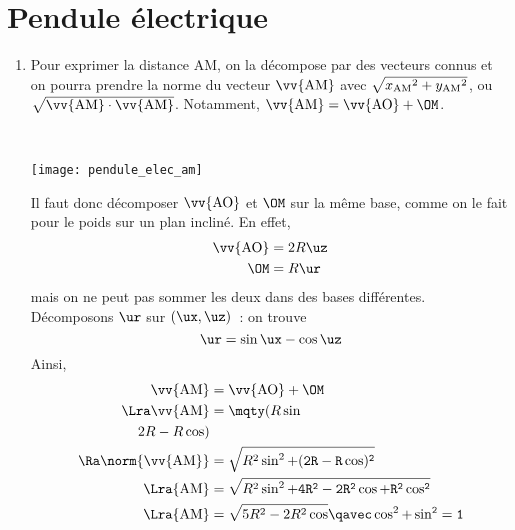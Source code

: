 \documentclass[a4paper, 12pt, final, garamond]{book}
\begin{document}
\section{Pendule électrique}
\begin{enumerate}
    \item Pour exprimer la distance AM, on la décompose par des vecteurs connus
        et on pourra prendre la norme du vecteur $\vv{\rm AM}$ avec
        $\sqrt{x_{\rm AM}{}^2 + y_{\rm AM}{}^2}$, ou $\sqrt{\vv{\rm
        AM}\cdot\vv{\rm AM}}$. Notamment, $\vv{\rm AM} = \vv{\rm AO} + \OM$.
        \begin{minipage}[t]{0.33\linewidth}
            ~%
            \begin{center}
                \texttt{[image: pendule\_elec\_am]}
                \captionsetup{justification=centering}
                \label{fig:pendule_am}
            \end{center}
        \end{minipage}
        \hfill
        \begin{minipage}[t]{0.65\linewidth}
            Il faut donc décomposer $\vv{\rm AO}$ et $\OM$ sur la même base,
            comme on le fait pour le poids sur un plan incliné. En effet,
            \begin{align*}
                \vv{\rm AO} &= 2R\uz\\
                \OM &= R\ur
            \end{align*}
            mais on ne peut pas sommer les deux dans des bases différentes.
            Décomposons $\ur$ sur $(\ux, \uz)$~: on trouve
            \[\ur = \sin\tt\ux -\cos\tt\uz\]
            Ainsi,\vspace{-24pt}
            \begin{align*}
                \vv{\rm AM} &= \vv{\rm AO} + \OM
                \\\Lra
                \vv{\rm AM} &= \mqty(R\sin\tt\\2R-R\cos\tt)
                \\\Ra
                \norm{\vv{\rm AM}} &= \sqrt{R^2\sin^2\tt + (2R-R\cos\tt)^2}
                \\\Lra
                {\rm AM} &= \sqrt{R^2\sin^2\tt + 4R^2 -2R^2\cos\tt +R^2\cos^2\tt}
                \\\Lra
                {\rm AM} &= \sqrt{5R^2 -2R^2\cos\tt}
                \qavec
                \cos^2\tt + \sin^2\tt = 1

\end{align*}
\end{minipage}
\end{enumerate}
\end{document}
